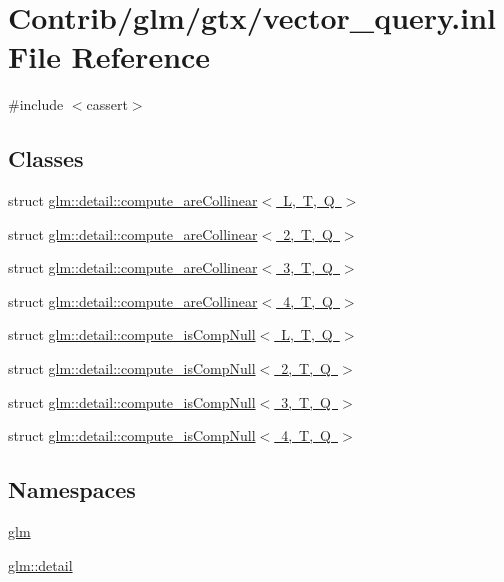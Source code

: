 \hypertarget{vector__query_8inl}{}\section{Contrib/glm/gtx/vector\+\_\+query.inl File Reference}
\label{vector__query_8inl}
{\ttfamily \#include $<$cassert$>$}\newline
\subsection*{Classes}
\begin{DoxyCompactItemize}
\item 
struct \mbox{\hyperlink{structglm_1_1detail_1_1compute__are_collinear}{glm\+::detail\+::compute\+\_\+are\+Collinear$<$ L, T, Q $>$}}
\item 
struct \mbox{\hyperlink{structglm_1_1detail_1_1compute__are_collinear_3_012_00_01_t_00_01_q_01_4}{glm\+::detail\+::compute\+\_\+are\+Collinear$<$ 2, T, Q $>$}}
\item 
struct \mbox{\hyperlink{structglm_1_1detail_1_1compute__are_collinear_3_013_00_01_t_00_01_q_01_4}{glm\+::detail\+::compute\+\_\+are\+Collinear$<$ 3, T, Q $>$}}
\item 
struct \mbox{\hyperlink{structglm_1_1detail_1_1compute__are_collinear_3_014_00_01_t_00_01_q_01_4}{glm\+::detail\+::compute\+\_\+are\+Collinear$<$ 4, T, Q $>$}}
\item 
struct \mbox{\hyperlink{structglm_1_1detail_1_1compute__is_comp_null}{glm\+::detail\+::compute\+\_\+is\+Comp\+Null$<$ L, T, Q $>$}}
\item 
struct \mbox{\hyperlink{structglm_1_1detail_1_1compute__is_comp_null_3_012_00_01_t_00_01_q_01_4}{glm\+::detail\+::compute\+\_\+is\+Comp\+Null$<$ 2, T, Q $>$}}
\item 
struct \mbox{\hyperlink{structglm_1_1detail_1_1compute__is_comp_null_3_013_00_01_t_00_01_q_01_4}{glm\+::detail\+::compute\+\_\+is\+Comp\+Null$<$ 3, T, Q $>$}}
\item 
struct \mbox{\hyperlink{structglm_1_1detail_1_1compute__is_comp_null_3_014_00_01_t_00_01_q_01_4}{glm\+::detail\+::compute\+\_\+is\+Comp\+Null$<$ 4, T, Q $>$}}
\end{DoxyCompactItemize}
\subsection*{Namespaces}
\begin{DoxyCompactItemize}
\item 
 \mbox{\hyperlink{namespaceglm}{glm}}
\item 
 \mbox{\hyperlink{namespaceglm_1_1detail}{glm\+::detail}}
\end{DoxyCompactItemize}

